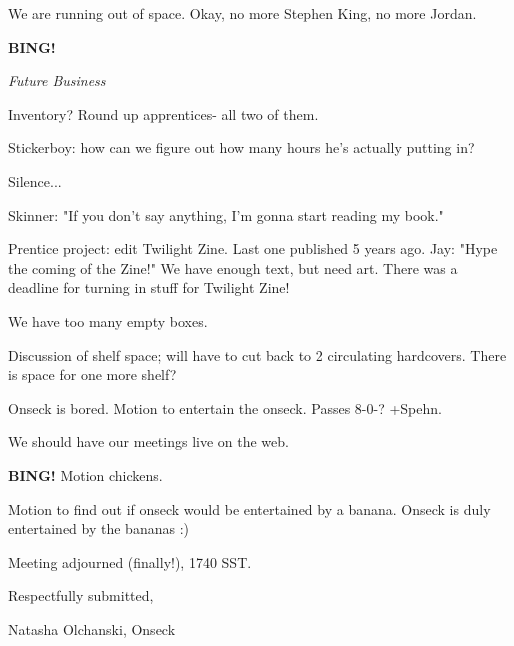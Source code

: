 \documentclass[12pt]{article}
\newcommand{\bing}{{\bf BING!} }
\newcommand{\goto}[1]{\bing \vskip 12pt \centerline{{\em{#1}}}}
\begin{document}
We are running out of space. Okay, no more Stephen King, no more Jordan.

\goto{Future Business}

Inventory? Round up apprentices- all two of them.

Stickerboy: how can we figure out how many hours he's actually putting in?

Silence...

Skinner: "If you don't say anything, I'm gonna start reading my book."

Prentice project: edit Twilight Zine. Last one published 5 years ago. Jay: "Hype the coming of the Zine!" We have enough text, but need art. There was a deadline for turning in stuff for Twilight Zine!

We have too many empty boxes.

Discussion of shelf space; will have to cut back to 2 circulating hardcovers. There is space for one more shelf?

Onseck is bored. Motion to entertain the onseck. Passes 8-0-? +Spehn.

We should have our meetings live on the web.

\bing Motion chickens.

Motion to find out if onseck would be entertained by a banana. Onseck is duly entertained by the bananas :)

\vspace{12pt}

\noindent
Meeting adjourned (finally!), 1740 SST.

\vspace{18pt}

\centerline{Respectfully submitted,}
\centerline{Natasha Olchanski, Onseck}
\end{document}
